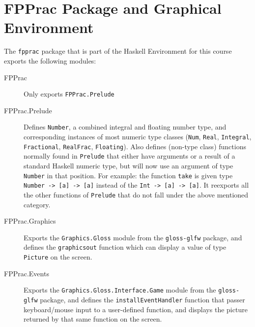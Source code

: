 \section{FPPrac Package and Graphical Environment}

The \texttt{fpprac} package that is part of the Haskell Environment for this course exports the following modules:
\begin{description}
  \item[FPPrac] Only exports \texttt{FPPrac.Prelude}
  \item[FPPrac.Prelude] Defines \texttt{Number}, a combined integral and floating number type, and corresponding instances of most numeric type classes (\texttt{Num}, \texttt{Real}, \texttt{Integral}, \texttt{Fractional}, \texttt{RealFrac}, \texttt{Floating}). 
  Also defines (non-type class) functions normally found in \texttt{Prelude} that either have arguments or a result of a standard Haskell numeric type, but will now use an argument of type \texttt{Number} in that position. 
  For example: the function  \texttt{take} is given type \texttt{Number -> [a] -> [a]} instead of the \texttt{Int -> [a] -> [a]}.
  It reexports all the other functions of \texttt{Prelude} that do not fall under the above mentioned category.
  \item[FPPrac.Graphics] Exports the \texttt{Graphics.Gloss} module from the \texttt{gloss-glfw} package, and defines the \texttt{graphicsout} function which can display a value of type \texttt{Picture} on the screen.
  \item[FPPrac.Events] Exports the \texttt{Graphics.Gloss.Interface.Game} module from the \texttt{gloss-glfw} package, and defines the \texttt{installEventHandler} function that passer keyboard/mouse input to a user-defined function, and displays the picture returned by that same function on the screen. 
\end{description}

